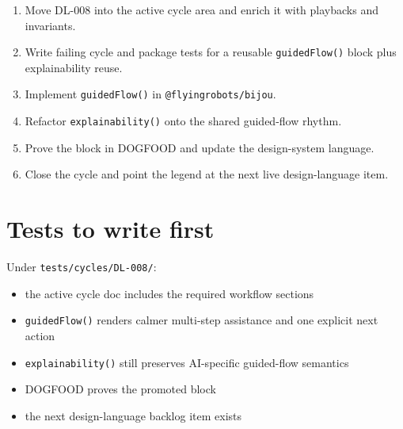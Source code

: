 \begin{enumerate}
\def\labelenumi{\arabic{enumi}.}
\tightlist
\item
  Move DL-008 into the active cycle area and enrich it with playbacks and invariants.
\item
  Write failing cycle and package tests for a reusable \texttt{g\allowbreak{}u\allowbreak{}i\allowbreak{}d\allowbreak{}e\allowbreak{}d\allowbreak{}F\allowbreak{}l\allowbreak{}o\allowbreak{}w\allowbreak{}(\allowbreak{})} block plus explainability reuse.
\item
  Implement \texttt{g\allowbreak{}u\allowbreak{}i\allowbreak{}d\allowbreak{}e\allowbreak{}d\allowbreak{}F\allowbreak{}l\allowbreak{}o\allowbreak{}w\allowbreak{}(\allowbreak{})} in \texttt{@\allowbreak{}f\allowbreak{}l\allowbreak{}y\allowbreak{}i\allowbreak{}n\allowbreak{}g\allowbreak{}r\allowbreak{}o\allowbreak{}b\allowbreak{}o\allowbreak{}t\allowbreak{}s\allowbreak{}/\allowbreak{}b\allowbreak{}i\allowbreak{}j\allowbreak{}o\allowbreak{}u}.
\item
  Refactor \texttt{e\allowbreak{}x\allowbreak{}p\allowbreak{}l\allowbreak{}a\allowbreak{}i\allowbreak{}n\allowbreak{}a\allowbreak{}b\allowbreak{}i\allowbreak{}l\allowbreak{}i\allowbreak{}t\allowbreak{}y\allowbreak{}(\allowbreak{})} onto the shared guided-flow rhythm.
\item
  Prove the block in DOGFOOD and update the design-system language.
\item
  Close the cycle and point the legend at the next live design-language item.
\end{enumerate}

\section{Tests to write first}\label{record-175-tests-to-write-first}

Under \texttt{t\allowbreak{}e\allowbreak{}s\allowbreak{}t\allowbreak{}s\allowbreak{}/\allowbreak{}c\allowbreak{}y\allowbreak{}c\allowbreak{}l\allowbreak{}e\allowbreak{}s\allowbreak{}/\allowbreak{}D\allowbreak{}L\allowbreak{}-\allowbreak{}0\allowbreak{}0\allowbreak{}8\allowbreak{}/}:

\begin{itemize}
\tightlist
\item
  the active cycle doc includes the required workflow sections
\item
  \texttt{g\allowbreak{}u\allowbreak{}i\allowbreak{}d\allowbreak{}e\allowbreak{}d\allowbreak{}F\allowbreak{}l\allowbreak{}o\allowbreak{}w\allowbreak{}(\allowbreak{})} renders calmer multi-step assistance and one explicit next action
\item
  \texttt{e\allowbreak{}x\allowbreak{}p\allowbreak{}l\allowbreak{}a\allowbreak{}i\allowbreak{}n\allowbreak{}a\allowbreak{}b\allowbreak{}i\allowbreak{}l\allowbreak{}i\allowbreak{}t\allowbreak{}y\allowbreak{}(\allowbreak{})} still preserves AI-specific guided-flow semantics
\item
  DOGFOOD proves the promoted block
\item
  the next design-language backlog item exists
\end{itemize}

